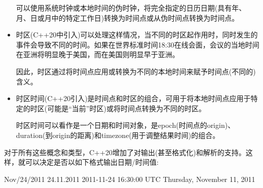\begin{itemize}
可以使用系统时钟或本地时间的伪时钟，将完全指定的日历日期(具有年、月、日或月中的特定工作日)转换为时间点或从伪时间点转换为时间点。

\item
时区(C++20中引入)可以处理这样情况，当不同的时区起作用时，同时发生的事件会导致不同的时间。如果在世界标准时间18:30在线会面，会议的当地时间在亚洲将明显晚于美国，而在美国则明显早于亚洲。

因此，时区通过将时间点应用或转换为不同的本地时间来赋予时间点(不同的)含义。

\item
时区时间(C++20引入)是时间点和时区的组合，可用于将本地时间点应用于特定的时区(可能是“当前”时区)或将时间点转换为不同的时区。

时区时间可以看作是一个日期和时间对象，是epoch(时间点的origin)、duration(到origin的距离)和timezone(用于调整结果时间)的组合。
\end{itemize}

对于所有这些概念和类型，C++20增加了对输出(甚至格式化)和解析的支持。这样，就可以决定是否以如下格式输出日期/时间值:

\begin{shell}
Nov/24/2011
24.11.2011
2011-11-24 16:30:00 UTC
Thursday, November 11, 2011
\end{shell}